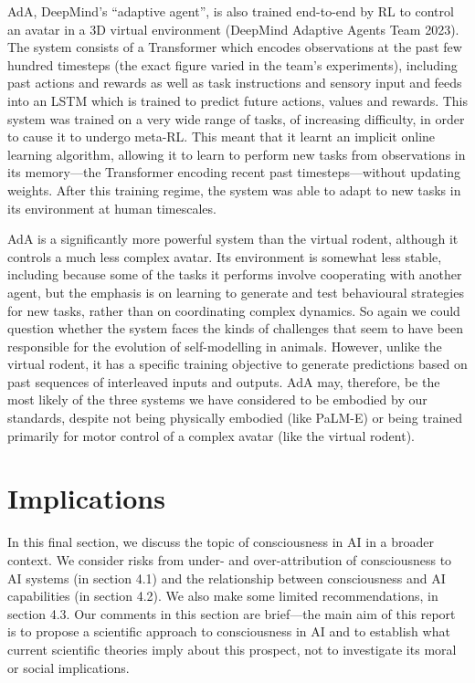 \documentclass[12pt]{article}
\begin{document}
AdA, DeepMind’s ``adaptive agent'', is also trained end-to-end by RL to control an avatar in a 3D virtual environment (DeepMind Adaptive Agents Team 2023). The system consists of a Transformer which encodes observations at the past few hundred timesteps (the exact figure varied in the team’s experiments), including past actions and rewards as well as task instructions and sensory input and feeds into an LSTM which is trained to predict future actions, values and rewards. This system was trained on a very wide range of tasks, of increasing difficulty, in order to cause it to undergo meta-RL. This meant that it learnt an implicit online learning algorithm, allowing it to learn to perform new tasks from observations in its memory—the Transformer encoding recent past timesteps—without updating weights. After this training regime, the system was able to adapt to new tasks in its environment at human timescales.

AdA is a significantly more powerful system than the virtual rodent, although it controls a much less complex avatar. Its environment is somewhat less stable, including because some of the tasks it performs involve cooperating with another agent, but the emphasis is on learning to generate and test behavioural strategies for new tasks, rather than on coordinating complex dynamics. So again we could question whether the system faces the kinds of challenges that seem to have been responsible for the evolution of self-modelling in animals. However, unlike the virtual rodent, it has a specific training objective to generate predictions based on past sequences of interleaved inputs and outputs. AdA may, therefore, be the most likely of the three systems we have considered to be embodied by our standards, despite not being physically embodied (like PaLM-E) or being trained primarily for motor control of a complex avatar (like the virtual rodent).

\newpage

\section{Implications}

In this final section, we discuss the topic of consciousness in AI in a broader context. We consider risks from under- and over-attribution of consciousness to AI systems (in section 4.1) and the relationship between consciousness and AI capabilities (in section 4.2). We also make some limited recommendations, in section 4.3. Our comments in this section are brief—the main aim of this report is to propose a scientific approach to consciousness in AI and to establish what current scientific theories imply about this prospect, not to investigate its moral or social implications.
\end{document}
